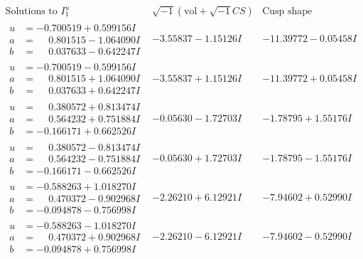 \documentclass[1p]{elsarticle_modified}
\theoremstyle{definition}
\newcommand{\I}{\sqrt{-1}}
\begin{document}
$$\begin{array}{c|c|c}  
\text{Solutions to }I^u_{1}& \I (\text{vol} + \sqrt{-1}CS) & \text{Cusp shape}\\
 \hline 
\begin{aligned}
u &= -0.700519 + 0.599156 I \\
a &= \phantom{-}0.801515 - 1.064090 I \\
b &= \phantom{-}0.037633 - 0.642247 I\end{aligned}
 & -3.55837 - 1.15126 I & -11.39772 - 0.05458 I \\ \hline\begin{aligned}
u &= -0.700519 - 0.599156 I \\
a &= \phantom{-}0.801515 + 1.064090 I \\
b &= \phantom{-}0.037633 + 0.642247 I\end{aligned}
 & -3.55837 + 1.15126 I & -11.39772 + 0.05458 I \\ \hline\begin{aligned}
u &= \phantom{-}0.380572 + 0.813474 I \\
a &= \phantom{-}0.564232 + 0.751884 I \\
b &= -0.166171 + 0.662526 I\end{aligned}
 & -0.05630 - 1.72703 I & -1.78795 + 1.55176 I \\ \hline\begin{aligned}
u &= \phantom{-}0.380572 - 0.813474 I \\
a &= \phantom{-}0.564232 - 0.751884 I \\
b &= -0.166171 - 0.662526 I\end{aligned}
 & -0.05630 + 1.72703 I & -1.78795 - 1.55176 I \\ \hline\begin{aligned}
u &= -0.588263 + 1.018270 I \\
a &= \phantom{-}0.470372 - 0.902968 I \\
b &= -0.094878 - 0.756998 I\end{aligned}
 & -2.26210 + 6.12921 I & -7.94602 + 0.52990 I \\ \hline\begin{aligned}
u &= -0.588263 - 1.018270 I \\
a &= \phantom{-}0.470372 + 0.902968 I \\
b &= -0.094878 + 0.756998 I\end{aligned}
 & -2.26210 - 6.12921 I & -7.94602 - 0.52990 I \\ \hline\begin{aligned}

\end{aligned}
\end{array}$$
\end{document}
